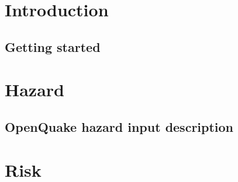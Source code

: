 \documentclass[12pt,a4paper,headings=small,version=first,dvips]{scrbook}
\begin{document}
\part{Introduction}
%	
\chapter{Getting started}
	
\part{Hazard}
%	
\chapter{OpenQuake hazard input description}
	\label{chap:hazinp}
	
%	
\part{Risk}
%	
\end{document}

